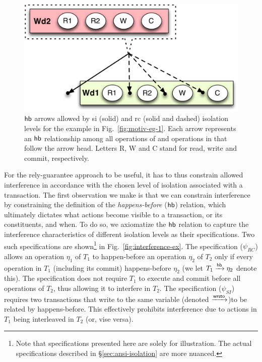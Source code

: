 \begin{figure}
\centering
  \includegraphics[scale=0.4]{Figures/motiv-eg-1-hb}

\caption{\small $\textsf{hb}$ arrows allowed by {\sc si} (solid) and {\sc rc} (solid
  and dashed) isolation levels for the example in
  Fig.~\ref{fig:motiv-eg-1}. Each arrow represents an $\textsf{hb}$ relationship
  among all operations of  and operations in  that follow
  the arrow head. Letters R, W and C stand for read, write and commit,
  respectively.}
\label{fig:motiv-eg-1-hb}
\vspace*{-8pt}
\end{figure}

For the rely-guarantee approach to be useful, it has to thus constrain
allowed interference in accordance with the chosen level of isolation
associated with a transaction. The first observation we make is that
we can constrain interference by constraining the definition of the
\emph{happens-before} ($\textsf{hb}$) relation, which ultimately dictates
what actions become visible to a transaction, or its constituents, and
when. To do so, we axiomatize the $\textsf{hb}$ relation to capture the
interference characteristics of different isolation levels as their
specifications. Two such specifications are shown\footnote{Note that
specifications presented here are solely for illustration. The actual
specifications described in \S\ref{sec:ansi-isolation} are more
nuanced.} in Fig.~\ref{fig:interference-ex}. The 
specification ($\psi_{RC}$) allows an operation $\eta_1$ of $T_1$ to
happen-before an operation $\eta_2$ of $T_2$ only if every operation
in $T_1$ (including its commit) happens-before $\eta_2$ (we let $T_1
\xrightarrow{\textsf{hb}} \eta_2$ denote this). The specification does not require $T_1$
to execute and commit before all operations of $T_2$, thus allowing it
to interfere in $T_2$. The  specification
($\psi_{SI}$) requires two transactions that write to the same
variable (denoted $\xrightarrow{\textsf{wrsto}}$)to be related by happens-before.  This
effectively prohibits interference due to actions in $T_1$ being
interleaved in $T_2$ (or, vise versa). 

